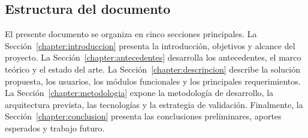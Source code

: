 \subsection{Estructura del documento}

El presente documento se organiza en cinco secciones principales. La Secci\'on~\ref{chapter:introduccion} presenta la introducci\'on, objetivos y alcance del proyecto. La Secci\'on~\ref{chapter:antecedentes} desarrolla los antecedentes, el marco te\'orico y el estado del arte. La Secci\'on~\ref{chapter:descripcion} describe la soluci\'on propuesta, los usuarios, los m\'odulos funcionales y los principales requerimientos. La Secci\'on~\ref{chapter:metodologia} expone la metodolog\'ia de desarrollo, la arquitectura prevista, las tecnolog\'ias y la estrategia de validaci\'on. Finalmente, la Secci\'on~\ref{chapter:conclusion} presenta las conclusiones preliminares, aportes esperados y trabajo futuro.


\FloatBarrier
